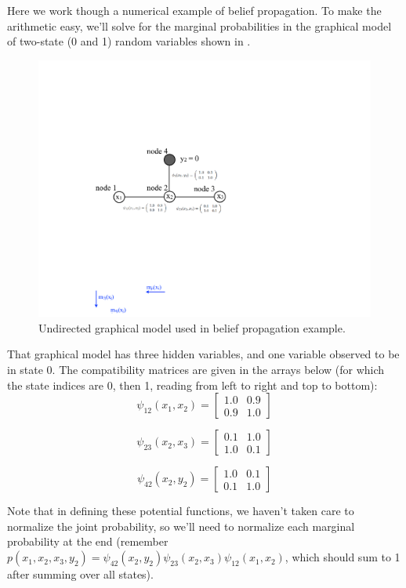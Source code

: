 Here we work though a numerical example of belief propagation.  To make the arithmetic easy,
we'll solve for the marginal probabilities in the graphical model of
two-state (0 and 1) random variables shown in \fig{\ref{fig:numerical}}.


\begin{figure}
\centerline{\includegraphics[width=0.48\linewidth]{figures/graphical_models/numerical2.pdf}} 
\caption{Undirected graphical model used in belief propagation example.} 
\label{fig:numerical}
\end{figure}

That
graphical model has three hidden variables, and one variable observed to
be in state 0.  The compatibility matrices are given in the arrays
below (for which the state indices are 0, then 1, reading from left to
right and top to bottom):
\begin{equation}
\psi_{12}(x_1, x_2) = 
\begin{bmatrix}
1.0 & 0.9 \\
0.9 & 1.0 
\end{bmatrix}
\end{equation}

\begin{equation}
\psi_{23}(x_2, x_3) = 
\begin{bmatrix}
0.1 & 1.0 \\
1.0 & 0.1 
\end{bmatrix}
\end{equation}

\begin{equation}
\psi_{42}(x_2, y_2) = 
\begin{bmatrix}
1.0 & 0.1 \\
0.1 & 1.0 
\end{bmatrix}
\end{equation}

Note that in defining these potential functions, we haven't taken care to normalize the joint probability, so
we'll need to normalize each marginal probability at the end
(remember $p(x_1,
x_2, x_3, y_2) = \psi_{42}(x_2, y_2) \psi_{23}(x_2, x_3) \psi_{12}(x_1,
x_2)$, which should sum to 1 after summing over all states).


